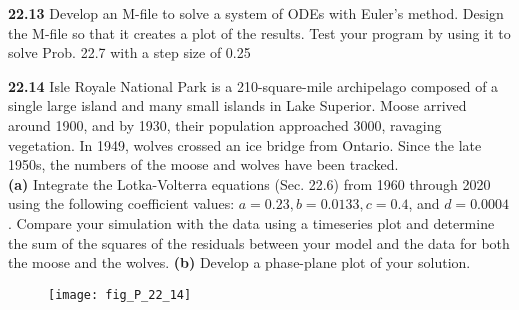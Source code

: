 \documentclass[../main.tex]{subfiles}
\begin{document}
\begin{multicols}{2}
    \noindent\textbf{22.13} Develop an M-file to solve a system of ODEs with
    Euler's method. Design the M-file so that it creates a plot of
    the results. Test your program by using it to solve Prob. 22.7
    with a step size of 0.25\vspace{2mm}

    \noindent\textbf{22.14} Isle Royale National Park is a 210-square-mile archipelago composed of a single large island and many small
    islands in Lake Superior. Moose arrived around 1900, and
    by 1930, their population approached 3000, ravaging vegetation. In 1949, wolves crossed an ice bridge from Ontario.
    Since the late 1950s, the numbers of the moose and wolves
    have been tracked.\\
    \textbf{(a)} Integrate the Lotka-Volterra equations (Sec. 22.6) from 1960 through 2020 using the following coefficient values: $a=0.23, b=0.0133, c=0.4$, and $d=0.0004$. Compare your simulation with the data using a timeseries plot and determine the sum of the squares of the residuals between your model and the data for both the moose and the wolves.
    \textbf{(b)} Develop a phase-plane plot of your solution.\vspace{2mm}

    \end{multicols}

    \begin{figure}[H]
        \centering
        \texttt{[image: fig\_P\_22\_14]}
    \end{figure}
\end{document}
